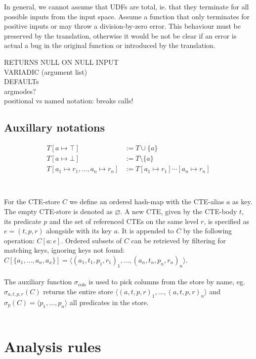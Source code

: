 In general, we cannot assume that UDFs are total, ie. that they terminate for all possible inputs from the input space. Assume a function that only terminates for positive inputs or may throw a division-by-zero error. This behaviour must be preserved by the translation, otherwise it would be not be clear if an error is actual a bug in the original function or introduced by the translation.

RETURNS NULL ON NULL INPUT\\
VARIADIC (argument list)\\
DEFAULTs\\
argmodes?\\
positional vs named notation: breaks calls!


\section{Auxillary notations}
\begin{align*}
    T[a \mapsto \top] &:= T \cup \{a\}\\
    T[a \mapsto \bot] &:= T \setminus \{a\}\\
    T[a_1 \mapsto r_1, ..., a_n \mapsto r_n] &:= T[a_1 \mapsto r_1] \cdots[a_n \mapsto r_n]\\
\end{align*}
\\\\
For the CTE-store $C$ we define an ordered hash-map with the CTE-alias $a$ as key. The empty CTE-store is denoted as $\varnothing$. A new CTE, given by the CTE-body $t$, its predicate $p$ and the set of referenced CTEs on the same level $r$, is specified as $e=(t, p, r)$ alongside with its key $a$. It is appended to $C$ by the following operation: $C[a: e]$. Ordered subsets of $C$ can be retrieved by filtering for matching keys, ignoring keys not found: $C[\{a_1, ..., a_n, a_x\}] = \langle (a_1, t_1, p_1, r_1)_1, \dots, (a_n, t_n, p_n, r_n)_n\rangle$.
\\\\
The auxiliary function $\sigma_{\text{cols}}$ is used to pick columns from the store by name, eg. $\sigma_{a, t, p, r}(C)$ returns the entire store $\langle (a, t, p, r)_1, \dots, (a, t, p, r)_n \rangle$ and $\sigma_p(C) = \langle p_1, \dots, p_n \rangle$ all predicates in the store.
\\\\


\chapter{Analysis rules}

